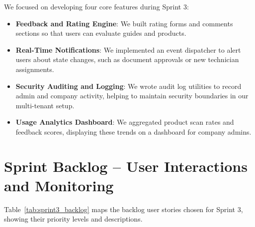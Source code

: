 \documentclass[12pt,a4paper]{report}
\begin{document}
We focused on developing four core features during Sprint 3:
\begin{itemize}
    \item \textbf{Feedback and Rating Engine}: We built rating forms and comments sections so that users can evaluate guides and products.
    \item \textbf{Real-Time Notifications}: We implemented an event dispatcher to alert users about state changes, such as document approvals or new technician assignments.
    \item \textbf{Security Auditing and Logging}: We wrote audit log utilities to record admin and company activity, helping to maintain security boundaries in our multi-tenant setup.
    \item \textbf{Usage Analytics Dashboard}: We aggregated product scan rates and feedback scores, displaying these trends on a dashboard for company admins.
\end{itemize}

\section{Sprint Backlog -- User Interactions and Monitoring}

Table~\ref{tab:sprint3_backlog} maps the backlog user stories chosen for Sprint 3, showing their priority levels and descriptions.

\renewcommand{\arraystretch}{1.3}
\setlength{\tabcolsep}{8pt}

\begin{table}[!htbp]
\centering
\caption{User stories for Release 3 (User Interactions and Monitoring)}
\label{tab:sprint3_backlog}
\end{table}
\end{document}
